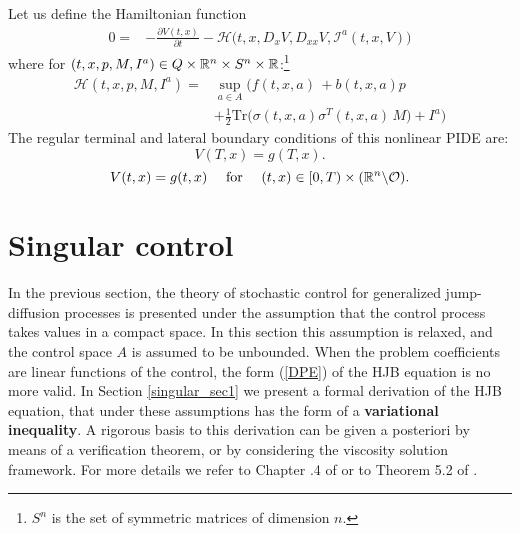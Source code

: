 Let us define the Hamiltonian function
\begin{align} \nonumber
 0 = & - \frac{\partial V(t,x)}{\partial t} - \mathcal{H}\bigl( t,x,D_x V, D_{xx} V, \mathcal{I}^a(t,x,V) \bigr) 
\end{align}
where for $(t,x,p,M,I^a) \in Q \times \mathbb{R}^n \times S^n \times \mathbb{R}$:\footnote{$S^n$ is the set of symmetric matrices of dimension $n$.} 
\begin{align}\label{Hamiltonian}
 \mathcal{H}(t,x,p,M,I^a) =& \sup_{a \in A} \biggl( f(t,x,a) \, + b(t,x,a) p \\ \nonumber
              &+ \frac{1}{2} \mbox{Tr} \bigl( \sigma(t,x,a)\sigma^T(t,x,a) \, M \bigr) +I^a \biggr) 
\end{align}
The regular terminal and lateral boundary conditions of this nonlinear PIDE are: 
\begin{equation}\label{DPE_term_cond}
 V(T,x) = g(T,x).
\end{equation}
\begin{equation}\label{DPE_lateral_cond}
 V(t,x) = g(t,x) \quad \mbox{ for } \quad (t,x) \in [0,T)\times (\mathbb{R}^n \backslash \mathcal{O}). 
\end{equation}


\section{Singular control}\label{singular_control}

In the previous section, the theory of stochastic control for generalized jump-diffusion processes is presented under the assumption that the control process 
takes values in a compact space.
In this section this assumption is relaxed, and the control space $A$ is assumed to be unbounded.
When the problem coefficients are linear functions of the control, the form (\ref{DPE}) of the HJB equation is no more valid. 
In Section \ref{singular_sec1}
we present a formal derivation of the HJB equation, that under these assumptions has the form of a \textbf{variational inequality}. 
A rigorous basis to this derivation can be given a posteriori by means of a verification theorem, or by considering the viscosity solution framework. 
For more details we refer to Chapter .4 of \cite{FlemingSoner} or to Theorem 5.2 of \cite{OksendalSulem}.

